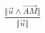 \begin{displaymath}
 \frac{\Vert\overrightarrow{u}\wedge\overrightarrow{AM}\Vert}{\Vert\overrightarrow{u}\Vert}
\end{displaymath}
